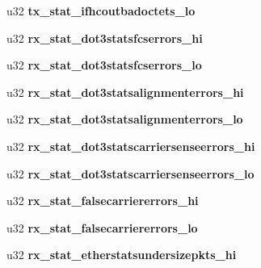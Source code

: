 \begin{DoxyCompactItemize}
\item 
\hypertarget{structbnx2x__eth__stats_add1644c13e0ecf4e29abdd01ffe16e6f}{
u32 {\bfseries tx\_\-stat\_\-ifhcoutbadoctets\_\-lo}}
\label{structbnx2x__eth__stats_add1644c13e0ecf4e29abdd01ffe16e6f}

\item 
\hypertarget{structbnx2x__eth__stats_a3b61479a25e2c5d8f040c77e1d334b9f}{
u32 {\bfseries rx\_\-stat\_\-dot3statsfcserrors\_\-hi}}
\label{structbnx2x__eth__stats_a3b61479a25e2c5d8f040c77e1d334b9f}

\item 
\hypertarget{structbnx2x__eth__stats_a6f8881821490e082f7c10de9f04097f2}{
u32 {\bfseries rx\_\-stat\_\-dot3statsfcserrors\_\-lo}}
\label{structbnx2x__eth__stats_a6f8881821490e082f7c10de9f04097f2}

\item 
\hypertarget{structbnx2x__eth__stats_ac415dc220c52a2f6668b848ef51308d0}{
u32 {\bfseries rx\_\-stat\_\-dot3statsalignmenterrors\_\-hi}}
\label{structbnx2x__eth__stats_ac415dc220c52a2f6668b848ef51308d0}

\item 
\hypertarget{structbnx2x__eth__stats_afc36c433aad03d12553450e0ca367875}{
u32 {\bfseries rx\_\-stat\_\-dot3statsalignmenterrors\_\-lo}}
\label{structbnx2x__eth__stats_afc36c433aad03d12553450e0ca367875}

\item 
\hypertarget{structbnx2x__eth__stats_ac3e06c9c834aac0c5a488bb710886ff0}{
u32 {\bfseries rx\_\-stat\_\-dot3statscarriersenseerrors\_\-hi}}
\label{structbnx2x__eth__stats_ac3e06c9c834aac0c5a488bb710886ff0}

\item 
\hypertarget{structbnx2x__eth__stats_ab45cca2edb98957784f06edb633fb498}{
u32 {\bfseries rx\_\-stat\_\-dot3statscarriersenseerrors\_\-lo}}
\label{structbnx2x__eth__stats_ab45cca2edb98957784f06edb633fb498}

\item 
\hypertarget{structbnx2x__eth__stats_a730c838b1ec8c4d11886897d979f44bd}{
u32 {\bfseries rx\_\-stat\_\-falsecarriererrors\_\-hi}}
\label{structbnx2x__eth__stats_a730c838b1ec8c4d11886897d979f44bd}

\item 
\hypertarget{structbnx2x__eth__stats_a3012b18bd07ad6bb2be6724c98dcf8e0}{
u32 {\bfseries rx\_\-stat\_\-falsecarriererrors\_\-lo}}
\label{structbnx2x__eth__stats_a3012b18bd07ad6bb2be6724c98dcf8e0}

\item 
\hypertarget{structbnx2x__eth__stats_a3ed93ec79f11569f5713be341b21deaa}{
u32 {\bfseries rx\_\-stat\_\-etherstatsundersizepkts\_\-hi}}
\label{structbnx2x__eth__stats_a3ed93ec79f11569f5713be341b21deaa}


\end{DoxyCompactItemize}
